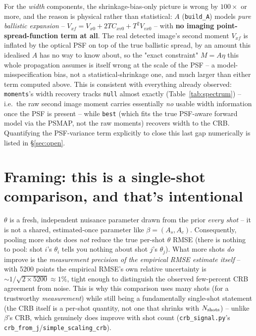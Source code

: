 \documentclass[11pt,a4paper]{article}
\newcommand{\code}[1]{\texttt{#1}}
\begin{document}
For the \emph{width} components, the shrinkage-bias-only picture is wrong
by $100\times$ or more, and the reason is physical rather than
statistical: $A$ (\code{build\_A}) models \emph{pure ballistic expansion}
-- $V_{xf}=V_{x0}+2TC_{xv0}+T^2V_{vx0}$ -- with \textbf{no imaging
point-spread-function term at all}. The real detected image's second
moment $V_{xf}$ is inflated by the optical PSF on top of the true ballistic
spread, by an amount this idealised $A$ has no way to know about, so the
"exact constraint" $M=A\eta$ this whole propagation assumes is itself
wrong at the scale of the PSF -- a model-misspecification bias, not a
statistical-shrinkage one, and much larger than either term computed above.
This is consistent with everything already observed: \code{moments}'s width
recovery tracks \code{null} almost exactly (Table~\ref{tab:spectrum}) --
i.e.\ the raw second image moment carries essentially \emph{no} usable width
information once the PSF is present -- while \code{best} (which fits the
true PSF-aware forward model via the PSMAP, not the raw moments) recovers
width to the CRB. Quantifying the PSF-variance term explicitly to close
this last gap numerically is listed in \S\ref{sec:open}.

\section{Framing: this is a single-shot comparison, and that's intentional}
\label{sec:framing}

$\theta$ is a fresh, independent nuisance parameter drawn from the prior
\emph{every shot} -- it is not a shared, estimated-once parameter like
$\beta=(A_s,A_c)$. Consequently, pooling more shots does \emph{not} reduce
the true per-shot $\theta$ RMSE (there is nothing to pool: shot $i$'s
$\theta_i$ tells you nothing about shot $j$'s $\theta_j$). What more shots
\emph{do} improve is the \emph{measurement precision of the empirical RMSE
estimate itself} -- with 5200 points the empirical RMSE's own relative
uncertainty is $\sim1/\sqrt{2\times5200}\approx1\%$, tight enough to
distinguish the observed few-percent CRB agreement from noise. This is why
this comparison uses many shots (for a trustworthy \emph{measurement}) while
still being a fundamentally single-shot statement (the CRB itself is a
per-shot quantity, not one that shrinks with $N_{\rm shots}$) -- unlike
$\beta$'s CRB, which genuinely does improve with shot count
(\code{crb\_signal.py}'s \code{crb\_from\_j}/\code{simple\_scaling\_crb}).
\end{document}
